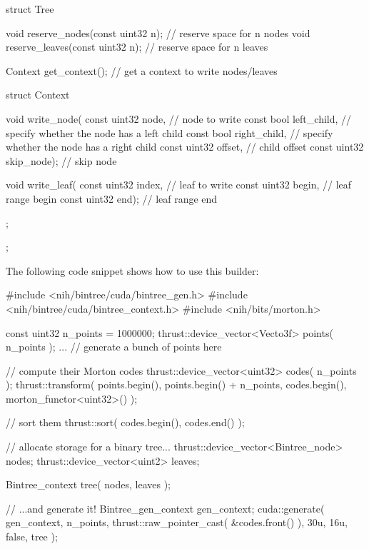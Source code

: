 \begin{DoxyCode}
 struct Tree
 {
    void reserve_nodes(const uint32 n);  // reserve space for n nodes
    void reserve_leaves(const uint32 n); // reserve space for n leaves

    Context get_context();           // get a context to write nodes/leaves

    struct Context
    {
        void write_node(
           const uint32 node,        // node to write
           const bool   left_child,  // specify whether the node has a left
       child
           const bool   right_child, // specify whether the node has a right
       child
           const uint32 offset,      // child offset
           const uint32 skip_node);  // skip node

        void write_leaf(
           const uint32 index,       // leaf to write
           const uint32 begin,       // leaf range begin
           const uint32 end);        // leaf range end
    };
 };
\end{DoxyCode}


\-The following code snippet shows how to use this builder\-:


\begin{DoxyCode}
 #include <nih/bintree/cuda/bintree_gen.h>
 #include <nih/bintree/cuda/bintree_context.h>
 #include <nih/bits/morton.h>

 const uint32 n_points = 1000000;
 thrust::device_vector<Vecto3f> points( n_points );
 ... // generate a bunch of points here

 // compute their Morton codes
 thrust::device_vector<uint32> codes( n_points );
 thrust::transform(
     points.begin(),
     points.begin() + n_points,
     codes.begin(),
     morton_functor<uint32>() );

 // sort them
 thrust::sort( codes.begin(), codes.end() );

 // allocate storage for a binary tree...
 thrust::device_vector<Bintree_node> nodes;
 thrust::device_vector<uint2>        leaves;

 Bintree_context tree( nodes, leaves );

 // ...and generate it!
 Bintree_gen_context gen_context;
 cuda::generate(
     gen_context,
     n_points,
     thrust::raw_pointer_cast( &codes.front() ),
     30u,
     16u,
     false,
     tree );
\end{DoxyCode}
 